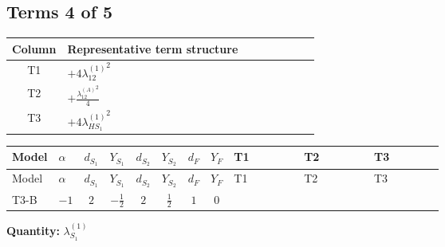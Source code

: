\documentclass[8pt]{article}
\begin{document}
\begin{landscape}
\subsection*{Terms 4 of 5}
\begin{center}
\begin{tabular}{@{}c >{\raggedright\arraybackslash}p{0.82\linewidth}@{}}
\toprule
Column & Representative term structure \\
\midrule
T1 & \(\displaystyle +4 {\lambda_{12}^{(1)}}^2\) \\
\midrule
T2 & \(\displaystyle +\frac{{\lambda_{12}^{(A)}}^2}{4}\) \\
\midrule
T3 & \(\displaystyle +4 {\lambda_{HS_1}^{(1)}}^2\) \\
\midrule
\bottomrule
\end{tabular}
\end{center}
\smallskip
\tiny
\begin{longtable}{@{}llcccccc >{\raggedright\arraybackslash}p{0.21\linewidth} >{\raggedright\arraybackslash}p{0.21\linewidth} >{\raggedright\arraybackslash}p{0.21\linewidth}@{}}
\toprule
Model & $\alpha$ & $d_{S_1}$ & $Y_{S_1}$ & $d_{S_2}$ & $Y_{S_2}$ & $d_F$ & $Y_F$ & T1 & T2 & T3 \\
\midrule
\endfirsthead
\toprule
Model & $\alpha$ & $d_{S_1}$ & $Y_{S_1}$ & $d_{S_2}$ & $Y_{S_2}$ & $d_F$ & $Y_F$ & T1 & T2 & T3 \\
\midrule
\endhead
T3-B & $-1$ & $2$ & $-\frac{1}{2}$ & $2$ & $\frac{1}{2}$ & $1$ & $0$ & \scriptsize\adjustbox{max width=\linewidth}{$\begin{gathered} +4 {\lambda_{12}^{(1)}}^2\end{gathered}$} & \scriptsize\adjustbox{max width=\linewidth}{$\begin{gathered} +\frac{{\lambda_{12}^{(A)}}^2}{4}\end{gathered}$} & \scriptsize\adjustbox{max width=\linewidth}{$\begin{gathered} +4 {\lambda_{HS_1}^{(1)}}^2\end{gathered}$} \\
\midrule
\bottomrule
\end{longtable}
\clearpage
\noindent\textbf{Quantity: }$\lambda_{S_1}^{(1)}$\par\smallskip

\end{landscape}
\end{document}
